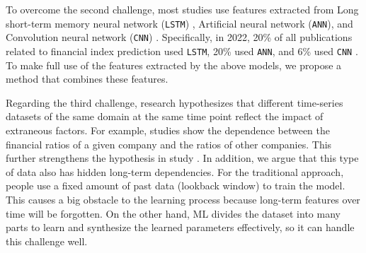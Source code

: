 \documentclass[aps,prb,groupedaddress,twocolumn,showpacs,dvipdfmx,superscriptaddress,pdftex]{revtex4-2}
\begin{document}
To overcome the second challenge, most studies use features extracted from Long short-term memory neural network (\verb|LSTM|) \cite{hochreiter1997long}, Artificial neural network (\verb|ANN|), and Convolution neural network (\verb|CNN|) \cite{lecun1989handwritten}. Specifically, in 2022, 20\% of all publications related to financial index prediction used \verb|LSTM|, 20\% used \verb|ANN|, and 6\% used \verb|CNN| \cite{ayitey2023forex}. To make full use of the features extracted by the above models, we propose a method that combines these features.

\vspace{2mm}


Regarding the third challenge, \cite{fama1970efficient} research hypothesizes that different time-series datasets of the same domain at the same time point reflect the impact of extraneous factors. For example, studies \citep{overreactioncontrarian, mech1993portfolio} show the dependence between the financial ratios of a given company and the ratios of other companies. This further strengthens the hypothesis in study \cite{fama1970efficient}. In addition, we argue that this type of data also has hidden long-term dependencies. For the traditional approach, people use a fixed amount of past data (lookback window) to train the model. This causes a big obstacle to the learning process because long-term features over time will be forgotten. On the other hand, ML divides the dataset into many parts to learn and synthesize the learned parameters effectively, so it can handle this challenge well.
\end{document}
